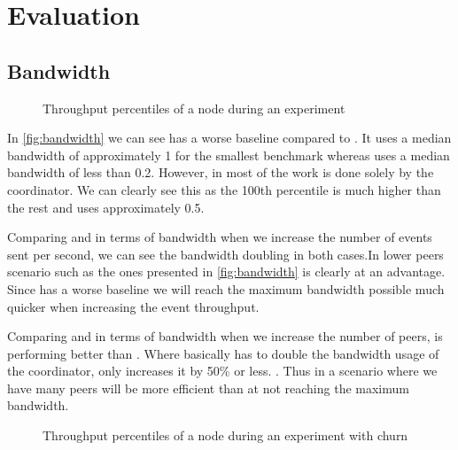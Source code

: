 
\section{Evaluation}
\subsection{Bandwidth}

\begin{figure}[h]
	\centering
	
	\vspace{-2mm} 
	\caption{Throughput percentiles of a node during an experiment}
	\vspace{-2mm} 
	\label{fig:bandwidth}
\end{figure}
In \autoref{fig:bandwidth} we can see \epto has a worse baseline compared to \jgroups. It uses a median bandwidth of approximately \SI{1}{\mbps} for the smallest benchmark whereas \jgroups uses a median bandwidth of less than \SI{0.2}{\mbps}. However, in \jgroups most of the work is done solely by the coordinator. We can clearly see this as the 100th percentile is much higher than the rest and uses approximately \SI{.5}{\mbps}.

Comparing \epto and \jgroups in terms of bandwidth when we increase the number of events sent per second, we can see the bandwidth doubling in both cases.In lower peers scenario such as the ones presented in \autoref{fig:bandwidth} \jgroups is clearly at an advantage. Since \epto has a worse baseline we will reach the maximum bandwidth possible much quicker when increasing the event throughput.

Comparing \epto and \jgroups in terms of bandwidth when we increase the number of peers, \epto is performing better than \jgroups. Where \jgroups basically has to double the bandwidth usage of the coordinator, \epto only increases it by 50\% or less. . Thus in a scenario where we have many peers \epto will be more efficient than \jgroups at not reaching the maximum bandwidth.

\begin{figure}
	\centering
	
	\vspace{-2mm} 
	\caption{Throughput percentiles of a node during an experiment with churn}
	\vspace{-2mm} 
	\label{fig:bandwidth-churn}
\end{figure}

